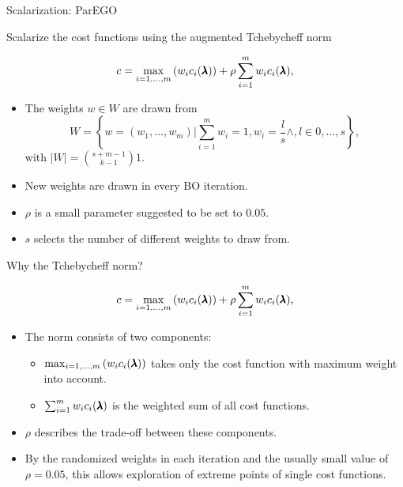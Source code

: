 \begin{frame}{Scalarization: ParEGO}

    Scalarize the cost functions using the augmented Tchebycheff norm

    $$
    c = \max_{i=1,\dots,m}\left(w_i c_i(\pmb{\lambda})\right) + \rho \sum_{i=1}^m w_ic_i(\pmb{\lambda}),
    $$

    \begin{itemize}
        \item The weights $w \in W$ are drawn from
            $$
                W = \left\{ w = (w_1, \dots, w_m) | \sum_{i=1}^m w_i = 1, w_i = \frac{l}{s} \wedge, l \in 0,\dots,s\right\},
            $$
            with $|W| = {{s+m-1}\choose{k-1}}1$.
        \item New weights are drawn in every BO iteration.
        \item $\rho$ is a small parameter suggested to be set to $0.05$.
        \item $s$ selects the number of different weights to draw from.
    \end{itemize}

\end{frame}

\begin{frame}{Why the Tchebycheff norm?}


    $$
    c = \max_{i=1,\dots,m}\left(w_i c_i(\pmb{\lambda})\right) + \rho \sum_{i=1}^m w_ic_i(\pmb{\lambda}),
    $$

    \begin{itemize}
        \item The norm consists of two components:
            \begin{itemize}
                    \item $\max_{i=1,\dots,m}\left(w_i c_i(\pmb{\lambda})\right)$ takes only the cost function with maximum weight into account.
                    \item $\sum_{i=1}^m w_ic_i(\pmb{\lambda})$ is the weighted sum of all cost functions.
            \end{itemize}
        \item $\rho$ describes the trade-off between these components.
        \item By the randomized weights in each iteration and the usually small value of $\rho = 0.05$, this allows exploration of extreme points of single cost functions.
    \end{itemize}

\end{frame}

